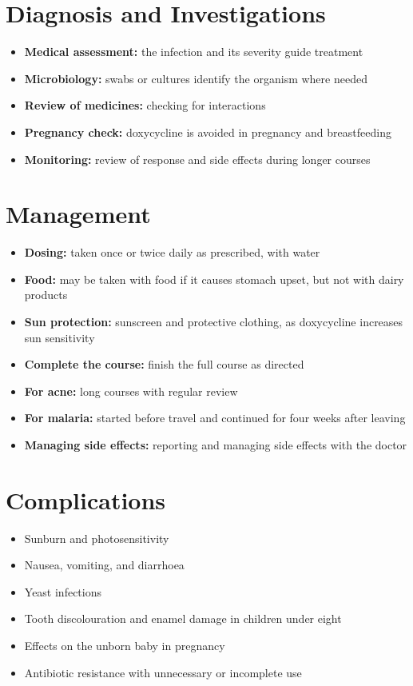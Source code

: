 \section*{Diagnosis and Investigations}
\begin{itemize}
    \item \textbf{Medical assessment:} the infection and its severity guide treatment
    \item \textbf{Microbiology:} swabs or cultures identify the organism where needed
    \item \textbf{Review of medicines:} checking for interactions
    \item \textbf{Pregnancy check:} doxycycline is avoided in pregnancy and breastfeeding
    \item \textbf{Monitoring:} review of response and side effects during longer courses
\end{itemize}

\section*{Management}
\begin{itemize}
    \item \textbf{Dosing:} taken once or twice daily as prescribed, with water
    \item \textbf{Food:} may be taken with food if it causes stomach upset, but not with dairy products
    \item \textbf{Sun protection:} sunscreen and protective clothing, as doxycycline increases sun sensitivity
    \item \textbf{Complete the course:} finish the full course as directed
    \item \textbf{For acne:} long courses with regular review
    \item \textbf{For malaria:} started before travel and continued for four weeks after leaving
    \item \textbf{Managing side effects:} reporting and managing side effects with the doctor
\end{itemize}

\section*{Complications}
\begin{itemize}
    \item Sunburn and photosensitivity
    \item Nausea, vomiting, and diarrhoea
    \item Yeast infections
    \item Tooth discolouration and enamel damage in children under eight
    \item Effects on the unborn baby in pregnancy
    \item Antibiotic resistance with unnecessary or incomplete use
\end{itemize}

